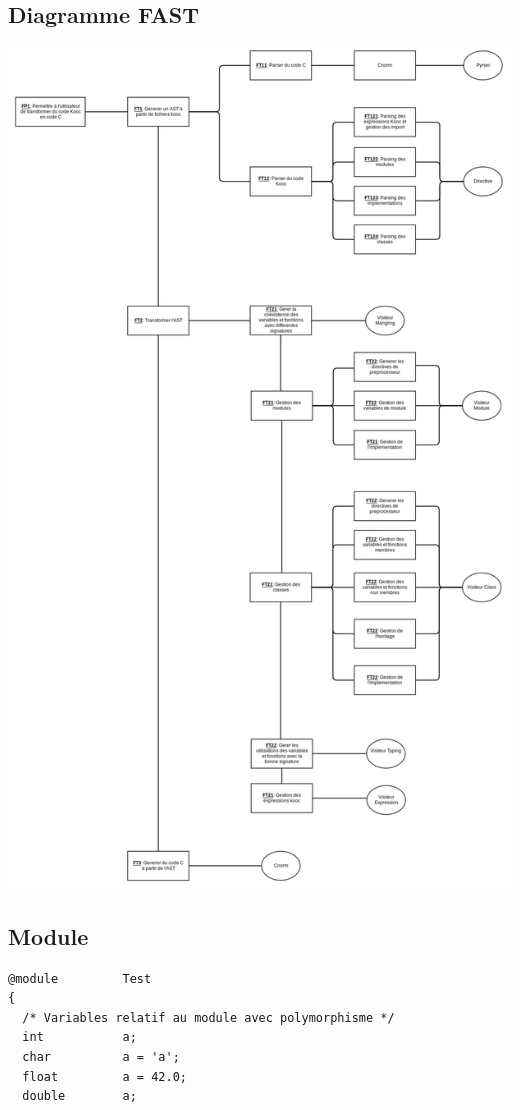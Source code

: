 \documentclass[12pt,a4paper]{article}
\begin{document}
\begin{NoHyper}
\subsection{Diagramme FAST}
\includegraphics[scale=0.3]{fast.png}
\subsection{Module}
\begin{lstlisting}[title={Module.kh}]
@module         Test
{
  /* Variables relatif au module avec polymorphisme */
  int           a;
  char          a = 'a';
  float         a = 42.0;
  double        a;


\end{lstlisting}
\end{NoHyper}
\end{document}
